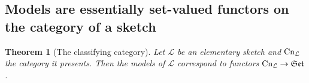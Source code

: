 \documentclass[12pt,twoside]{reedthesis}
\theoremstyle{definition}
\theoremstyle{remark}
\theoremstyle{plain}
\newtheorem{theorem}{Theorem}
\begin{document}

\subsection{Models are essentially set-valued functors on the category of a sketch}
\begin{theorem}[The classifying category]\label{thm:classify_elem_sketch}
  Let $\mathcal{L}$ be an elementary sketch and \( \mathrm{Cn}_{\mathcal{L}} \) the
  category it presents. Then the models of $\mathcal{L}$ correspond to functors
  $\mathrm{Cn}_{\mathcal{L}} \rightarrow \mathfrak{Set}$.
\end{theorem}
\end{document}
